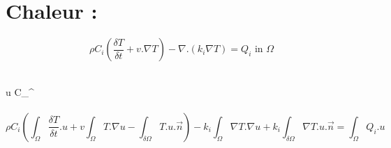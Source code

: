 \documentclass{article}
\begin{document}
\section{Chaleur :} 

\begin{equation*}
\rho C_{i} \left( \frac{\delta T }{\delta t} + v.\nabla T \right) - \nabla . \left( k_{i} \nabla T \right) = Q_{i} \text{ in } \Omega
\end{equation*}


\\
\forall u \in C_{}^{\infty}\\ \\
\begin{equation*}
\rho C_{i} \left( \int_{\Omega} \frac{\delta T }{\delta t}.u + v \int_{\Omega} T.\nabla u - \int_{\delta \Omega} T.u.\vec{n} \right) - k_{i} \int_{\Omega} \nabla T.\nabla u + k_{i} \int_{\delta \Omega} \nabla T.u.\vec{n} = \int_{\Omega} Q_{i}.u
\end{equation*}
\end{document}
